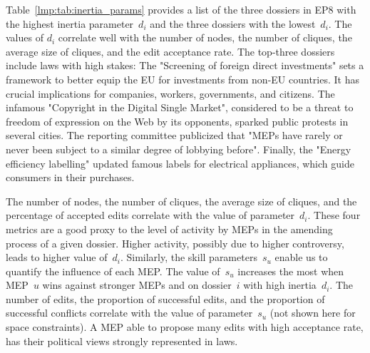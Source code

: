 Table~\ref{lmp:tab:inertia_params} provides a list of the three dossiers in EP8 with the highest inertia parameter~$d_i$ and the three dossiers with the lowest~$ d_i $.
The values of $d_i$ correlate well with the number of nodes, the number of cliques, the average size of cliques, and the edit acceptance rate.
The top-three dossiers include laws with high stakes:
The "Screening of foreign direct investments" sets a framework to better equip the EU for investments from non-EU countries.
It has crucial implications for companies, workers, governments, and citizens.
The infamous "Copyright in the Digital Single Market", considered to be a threat to freedom of expression on the Web by its opponents, sparked public protests in several cities.
The reporting committee publicized that "MEPs have rarely or never been subject to a similar degree of lobbying before"\cite{europarl2019questions}.
Finally, the "Energy efficiency labelling" updated famous labels for electrical appliances, which guide consumers in their purchases.

The number of nodes, the number of cliques, the average size of cliques, and the percentage of accepted edits correlate with the value of parameter~$ d_i$.
These four metrics are a good proxy to the level of activity by MEPs in the amending process of a given dossier.
Higher activity, possibly due to higher controversy, leads to higher value of~$d_i$.
Similarly, the skill parameters~$s_u$ enable us to quantify the influence of each MEP.
The value of~$s_u$ increases the most when MEP~$u$ wins against stronger MEPs and on dossier~$i$ with high inertia~$d_i$.
The number of edits, the proportion of successful edits, and the proportion of successful conflicts correlate with the value of parameter~$s_u$ (not shown here for space constraints).
A MEP able to propose many edits with high acceptance rate, has their political views strongly represented in laws.



